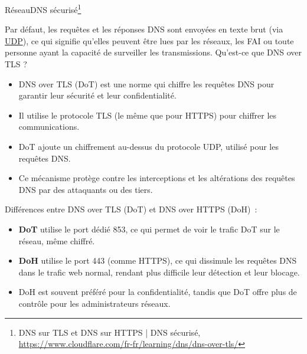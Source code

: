 \documentclass{beamer}
\begin{document}
    \begin{frame}{Réseau}{DNS sécurisé\footnote{\label{doh-dot}DNS sur TLS et DNS sur HTTPS | DNS sécurisé, \url{https://www.cloudflare.com/fr-fr/learning/dns/dns-over-tls/}}}
        \begin{small}
            Par défaut, les requêtes et les réponses DNS sont envoyées en texte brut (via \href{https://www.cloudflare.com/learning/ddos/glossary/user-datagram-protocol-udp/}{UDP}), ce qui signifie qu'elles peuvent être lues par les réseaux, les FAI ou toute personne ayant la capacité de surveiller les transmissions.
            Qu'est-ce que DNS over TLS ?
            \begin{itemize}
                \item DNS over TLS (DoT) est une norme qui chiffre les requêtes DNS pour garantir leur sécurité et leur confidentialité.
                \item Il utilise le protocole TLS (le même que pour HTTPS) pour chiffrer les communications.
                \item DoT ajoute un chiffrement au-dessus du protocole UDP, utilisé pour les requêtes DNS.
                \item Ce mécanisme protège contre les interceptions et les altérations des requêtes DNS par des attaquants ou des tiers.
            \end{itemize}
            Différences entre DNS over TLS (DoT) et DNS over HTTPS (DoH)~:
            \begin{itemize}
                \item \textbf{DoT} utilise le port dédié 853, ce qui permet de voir le trafic DoT sur le réseau, même chiffré.
                \item \textbf{DoH} utilise le port 443 (comme HTTPS), ce qui dissimule les requêtes DNS dans le trafic web normal, rendant plus difficile leur détection et leur blocage.
                \item DoH est souvent préféré pour la confidentialité, tandis que DoT offre plus de contrôle pour les administrateurs réseaux.
            \end{itemize}
        \end{small}
    \end{frame}
\end{document}
